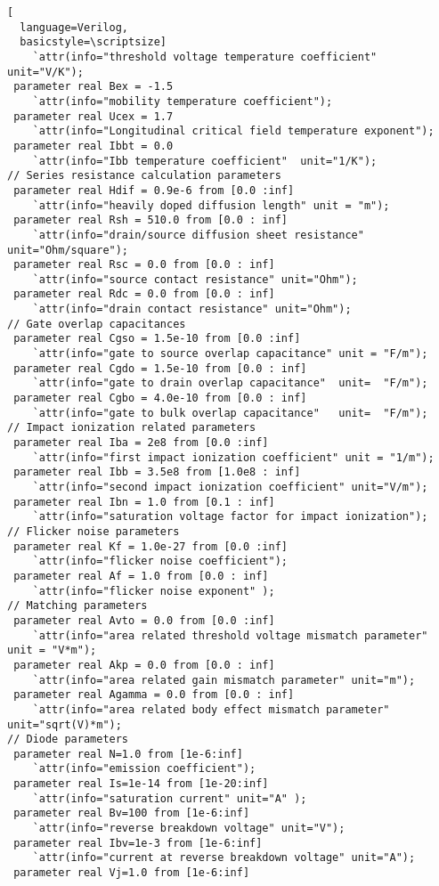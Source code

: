 \begin{lstlisting}[
  language=Verilog,
  basicstyle=\scriptsize]
	`attr(info="threshold voltage temperature coefficient" unit="V/K");
 parameter real Bex = -1.5     
	`attr(info="mobility temperature coefficient");
 parameter real Ucex = 1.7     
	`attr(info="Longitudinal critical field temperature exponent");
 parameter real Ibbt = 0.0     
	`attr(info="Ibb temperature coefficient"  unit="1/K");
// Series resistance calculation parameters
 parameter real Hdif = 0.9e-6 from [0.0 :inf]  
	`attr(info="heavily doped diffusion length" unit = "m");
 parameter real Rsh = 510.0 from [0.0 : inf]   
	`attr(info="drain/source diffusion sheet resistance" unit="Ohm/square");
 parameter real Rsc = 0.0 from [0.0 : inf]     
	`attr(info="source contact resistance" unit="Ohm");
 parameter real Rdc = 0.0 from [0.0 : inf]     
	`attr(info="drain contact resistance" unit="Ohm");
// Gate overlap capacitances
 parameter real Cgso = 1.5e-10 from [0.0 :inf]  
	`attr(info="gate to source overlap capacitance" unit = "F/m");
 parameter real Cgdo = 1.5e-10 from [0.0 : inf] 
	`attr(info="gate to drain overlap capacitance"  unit=  "F/m");
 parameter real Cgbo = 4.0e-10 from [0.0 : inf] 
	`attr(info="gate to bulk overlap capacitance"   unit=  "F/m");
// Impact ionization related parameters
 parameter real Iba = 2e8 from [0.0 :inf]        
	`attr(info="first impact ionization coefficient" unit = "1/m");
 parameter real Ibb = 3.5e8 from [1.0e8 : inf]   
	`attr(info="second impact ionization coefficient" unit="V/m");
 parameter real Ibn = 1.0 from [0.1 : inf]       
	`attr(info="saturation voltage factor for impact ionization");
// Flicker noise parameters
 parameter real Kf = 1.0e-27 from [0.0 :inf]   
	`attr(info="flicker noise coefficient");
 parameter real Af = 1.0 from [0.0 : inf]      
	`attr(info="flicker noise exponent" );
// Matching parameters
 parameter real Avto = 0.0 from [0.0 :inf]     
	`attr(info="area related threshold voltage mismatch parameter" unit = "V*m");
 parameter real Akp = 0.0 from [0.0 : inf]     
	`attr(info="area related gain mismatch parameter" unit="m");
 parameter real Agamma = 0.0 from [0.0 : inf]  
	`attr(info="area related body effect mismatch parameter" unit="sqrt(V)*m");
// Diode parameters
 parameter real N=1.0 from [1e-6:inf]          
	`attr(info="emission coefficient");
 parameter real Is=1e-14 from [1e-20:inf]      
	`attr(info="saturation current" unit="A" );
 parameter real Bv=100 from [1e-6:inf]        
	`attr(info="reverse breakdown voltage" unit="V");
 parameter real Ibv=1e-3 from [1e-6:inf]       
	`attr(info="current at reverse breakdown voltage" unit="A");
 parameter real Vj=1.0 from [1e-6:inf]         

\end{lstlisting}
